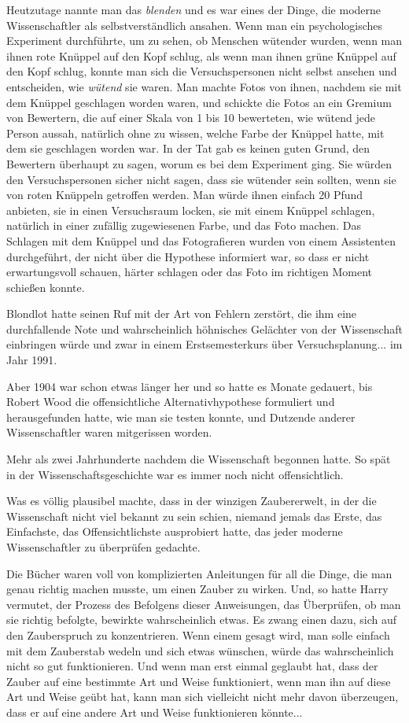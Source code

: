 Heutzutage nannte man das \glqq \emph{blenden}\grqq{} und es war eines der
Dinge, die moderne Wissenschaftler als selbstverständlich ansahen. Wenn man ein
psychologisches Experiment durchführte, um zu sehen, ob Menschen wütender
wurden, wenn man ihnen rote Knüppel auf den Kopf schlug, als wenn man ihnen
grüne Knüppel auf den Kopf schlug, konnte man sich die Versuchspersonen nicht
selbst ansehen und entscheiden, wie \glqq \emph{wütend}\grqq{} sie waren. Man
machte Fotos von ihnen, nachdem sie mit dem Knüppel geschlagen worden waren, und
schickte die Fotos an ein Gremium von Bewertern, die auf einer Skala von 1 bis
10 bewerteten, wie wütend jede Person aussah, natürlich ohne zu wissen, welche
Farbe der Knüppel hatte, mit dem sie geschlagen worden war. In der Tat gab es
keinen guten Grund, den Bewertern überhaupt zu sagen, worum es bei dem
Experiment ging. Sie würden den Versuchspersonen sicher nicht sagen, dass sie
wütender sein sollten, wenn sie von roten Knüppeln getroffen werden. Man würde
ihnen einfach 20 Pfund anbieten, sie in einen Versuchsraum locken, sie mit einem
Knüppel schlagen, natürlich in einer zufällig zugewiesenen Farbe, und das Foto
machen. Das Schlagen mit dem Knüppel und das Fotografieren wurden von einem
Assistenten durchgeführt, der nicht über die Hypothese informiert war, so dass
er nicht erwartungsvoll schauen, härter schlagen oder das Foto im richtigen
Moment schießen konnte.

Blondlot hatte seinen Ruf mit der Art von Fehlern zerstört, die ihm eine
durchfallende Note und wahrscheinlich höhnisches Gelächter von der Wissenschaft
einbringen würde und zwar in einem Erstsemesterkurs über Versuchsplanung... im
Jahr 1991.

Aber 1904 war schon etwas länger her und so hatte es Monate gedauert, bis Robert
Wood die offensichtliche Alternativhypothese formuliert und herausgefunden
hatte, wie man sie testen konnte, und Dutzende anderer Wissenschaftler waren
mitgerissen worden.

Mehr als zwei Jahrhunderte nachdem die Wissenschaft begonnen hatte. So spät in
der Wissenschaftsgeschichte war es immer noch nicht offensichtlich.

Was es völlig plausibel machte, dass in der winzigen Zaubererwelt, in der die
Wissenschaft nicht viel bekannt zu sein schien, niemand jemals das Erste, das
Einfachste, das Offensichtlichste ausprobiert hatte, das jeder moderne
Wissenschaftler zu überprüfen gedachte.

Die Bücher waren voll von komplizierten Anleitungen für all die Dinge, die man
genau richtig machen musste, um einen Zauber zu wirken. Und, so hatte Harry
vermutet, der Prozess des Befolgens dieser Anweisungen, das Überprüfen, ob man
sie richtig befolgte, bewirkte wahrscheinlich etwas. Es zwang einen dazu, sich
auf den Zauberspruch zu konzentrieren. Wenn einem gesagt wird, man solle einfach
mit dem Zauberstab wedeln und sich etwas wünschen, würde das wahrscheinlich
nicht so gut funktionieren. Und wenn man erst einmal geglaubt hat, dass der
Zauber auf eine bestimmte Art und Weise funktioniert, wenn man ihn auf diese Art
und Weise geübt hat, kann man sich vielleicht nicht mehr davon überzeugen, dass
er auf eine andere Art und Weise funktionieren könnte...

